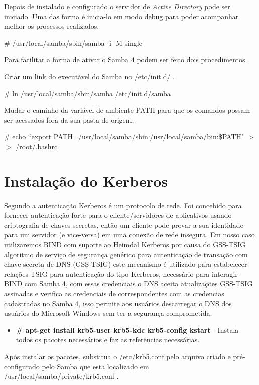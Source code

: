 Depois de instalado e configurado o servidor de \textit{Active Directory} pode ser iniciado. Uma das forma é inicia-lo em modo debug para poder acompanhar melhor os processos realizados.

\# /usr/local/samba/sbin/samba -i -M single

Para facilitar a forma de ativar o Samba 4 podem ser feito dois procedimentos.

Criar um link do executável do Samba no /etc/init.d/ .

\# ln /usr/local/samba/sbin/samba /etc/init.d/samba

Mudar o caminho da variável de ambiente PATH para que os comandos possam ser acessados fora da sua pasta de origem.

\# echo ``export PATH=/usr/local/samba/sbin:/usr/local/samba/bin:\$PATH"  $>$$>$ /root/.bashrc



\section{Instalação do Kerberos}

Segundo \cite{HEIMDAL} a autenticação Kerberos é um protocolo de rede. Foi concebido para fornecer autenticação forte para o cliente/servidores de aplicativos usando criptografia de chaves secretas, então um cliente pode provar a sua identidade para um servidor (e vice-versa) em uma conexão de rede insegura.
Em nosso caso utilizaremos BIND com suporte ao Heimdal Kerberos por causa do GSS-TSIG algoritmo de serviço de segurança genérico para autenticação de transação com chave secreta de DNS (GSS-TSIG) este mecanismo é utilizado para estabelecer relações TSIG para autenticação do tipo Kerberos, necessário para interagir BIND com Samba 4, com essas credenciais o DNS aceita atualizações GSS-TSIG assinadas e verifica as credenciais de correspondentes com as credencias cadastradas no Samba 4, isso permite aos usuários descarregar o DNS dos usuários do Microsoft Windows sem ter a segurança comprometida.

\begin{itemize}
	\item \textbf{\# apt-get install krb5-user krb5-kdc krb5-config kstart} - Instala todos os pacotes necessários e faz as referências necessárias.
\end{itemize}

Após instalar os pacotes, substitua o /etc/krb5.conf pelo arquivo criado e pré-configurado pelo Samba que esta localizado em /usr/local/samba/private/krb5.conf .

